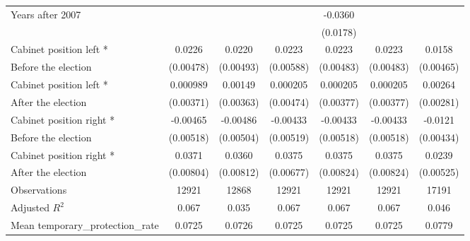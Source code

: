 \begin{table}[!ht]
\begin{tabular}{l*{6}{c}}
Years after 2007    &                     &                     &                     &     -0.0360\sym{*}  &                     &                     \\
                    &                     &                     &                     &    (0.0178)         &                     &                     \\
[0,5em]
Cabinet position left * &      0.0226\sym{***}&      0.0220\sym{***}&      0.0223\sym{***}&      0.0223\sym{***}&      0.0223\sym{***}&      0.0158\sym{**} \\
Before the election                    &   (0.00478)         &   (0.00493)         &   (0.00588)         &   (0.00483)         &   (0.00483)         &   (0.00465)         \\
[0,5em]
Cabinet position left * &    0.000989         &     0.00149         &    0.000205         &    0.000205         &    0.000205         &     0.00264         \\
After the election                    &   (0.00371)         &   (0.00363)         &   (0.00474)         &   (0.00377)         &   (0.00377)         &   (0.00281)         \\
[0,5em]
Cabinet position right * &    -0.00465         &    -0.00486         &    -0.00433         &    -0.00433         &    -0.00433         &     -0.0121\sym{**} \\
Before the election                    &   (0.00518)         &   (0.00504)         &   (0.00519)         &   (0.00518)         &   (0.00518)         &   (0.00434)         \\
[0,5em]
Cabinet position right * &      0.0371\sym{***}&      0.0360\sym{***}&      0.0375\sym{***}&      0.0375\sym{***}&      0.0375\sym{***}&      0.0239\sym{***}\\
After the election                    &   (0.00804)         &   (0.00812)         &   (0.00677)         &   (0.00824)         &   (0.00824)         &   (0.00525)         \\
\hline
Observations        &       12921         &       12868         &       12921         &       12921         &       12921         &       17191         \\
Adjusted \(R^{2}\)  &       0.067         &       0.035         &       0.067         &       0.067         &       0.067         &       0.046         \\
Mean temporary\_protection\_rate&      0.0725         &      0.0726         &      0.0725         &      0.0725         &      0.0725         &      0.0779         \\

\end{tabular}
\end{table}
